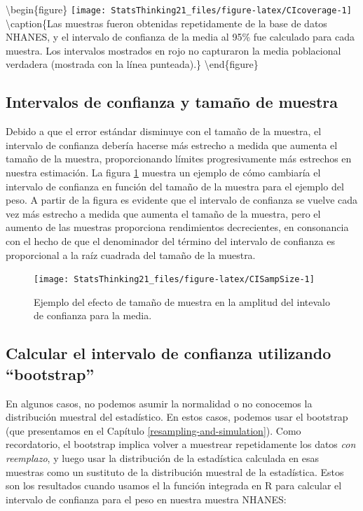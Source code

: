 \documentclass[
  12pt,
]{book}
\begin{document}
\textbackslash begin\{figure\}
\texttt{[image: StatsThinking21\_files/figure-latex/CIcoverage-1]} \textbackslash caption\{Las muestras fueron obtenidas repetidamente de la base de datos NHANES, y el intervalo de confianza de la media al 95\% fue calculado para cada muestra. Los intervalos mostrados en rojo no capturaron la media poblacional verdadera (mostrada con la línea punteada).\}\label{fig:CIcoverage}
\textbackslash end\{figure\}

\hypertarget{intervalos-de-confianza-y-tamauxf1o-de-muestra}{%
\subsection{Intervalos de confianza y tamaño de muestra}\label{intervalos-de-confianza-y-tamauxf1o-de-muestra}}

Debido a que el error estándar disminuye con el tamaño de la muestra, el intervalo de confianza debería hacerse más estrecho a medida que aumenta el tamaño de la muestra, proporcionando límites progresivamente más estrechos en nuestra estimación. La figura \ref{fig:CISampSize} muestra un ejemplo de cómo cambiaría el intervalo de confianza en función del tamaño de la muestra para el ejemplo del peso. A partir de la figura es evidente que el intervalo de confianza se vuelve cada vez más estrecho a medida que aumenta el tamaño de la muestra, pero el aumento de las muestras proporciona rendimientos decrecientes, en consonancia con el hecho de que el denominador del término del intervalo de confianza es proporcional a la raíz cuadrada del tamaño de la muestra.

\begin{figure}
\texttt{[image: StatsThinking21\_files/figure-latex/CISampSize-1]} \caption{Ejemplo del efecto de tamaño de muestra en la amplitud del intevalo de confianza para la media.}\label{fig:CISampSize}
\end{figure}

\hypertarget{calcular-el-intervalo-de-confianza-utilizando-bootstrap}{%
\subsection{Calcular el intervalo de confianza utilizando ``bootstrap''}\label{calcular-el-intervalo-de-confianza-utilizando-bootstrap}}

En algunos casos, no podemos asumir la normalidad o no conocemos la distribución muestral del estadístico. En estos casos, podemos usar el bootstrap (que presentamos en el Capítulo \ref{resampling-and-simulation}). Como recordatorio, el bootstrap implica volver a muestrear repetidamente los datos \emph{con reemplazo}, y luego usar la distribución de la estadística calculada en esas muestras como un sustituto de la distribución muestral de la estadística. Estos son los resultados cuando usamos el la función integrada en R para calcular el intervalo de confianza para el peso en nuestra muestra NHANES:
\end{document}
